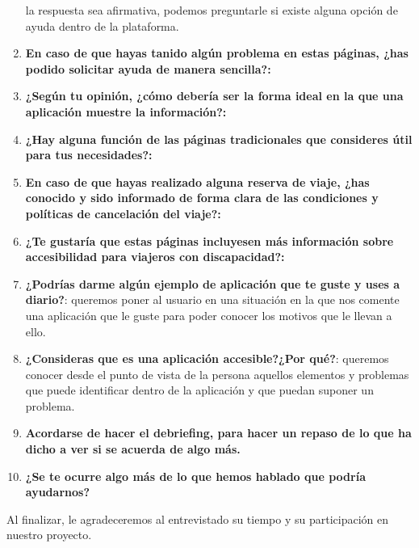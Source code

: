 \begin{enumerate}
                la respuesta sea afirmativa, podemos preguntarle si existe alguna opción de ayuda dentro de la plataforma.
    \item {\textbf{En caso de que hayas tanido algún problema en estas páginas, ¿has podido solicitar ayuda de manera sencilla?:}}
    \item {\textbf{¿Según tu opinión, ¿cómo debería ser la forma ideal en la que una aplicación muestre la información?:}}
    \item {\textbf{¿Hay alguna función de las páginas tradicionales que consideres útil para tus necesidades?:}}
    \item {\textbf{En caso de que hayas realizado alguna reserva de viaje, ¿has conocido y sido informado de forma clara de las condiciones
                        y políticas de cancelación del viaje?:}}
    \item {\textbf{¿Te gustaría que estas páginas incluyesen más información sobre accesibilidad para viajeros con discapacidad?:}}
    \item {\textbf{¿Podrías darme algún ejemplo de aplicación que te guste y uses a diario?}}: queremos poner al usuario en una situación
    en la que nos comente una aplicación que le guste para poder conocer los motivos que le llevan a ello.
    \item {\textbf{¿Consideras que es una aplicación accesible?¿Por qué?}}: queremos conocer desde el punto de vista de la persona aquellos
    elementos y problemas que puede identificar dentro de la aplicación y que puedan suponer un problema.
    \item {\textbf{Acordarse de hacer el debriefing, para hacer un repaso de lo que ha dicho a ver si se acuerda de algo más.}}
    \item {\textbf{¿Se te ocurre algo más de lo que hemos hablado que podría ayudarnos?}}
\end{enumerate}

Al finalizar, le agradeceremos al entrevistado su tiempo y su participación en nuestro proyecto.
